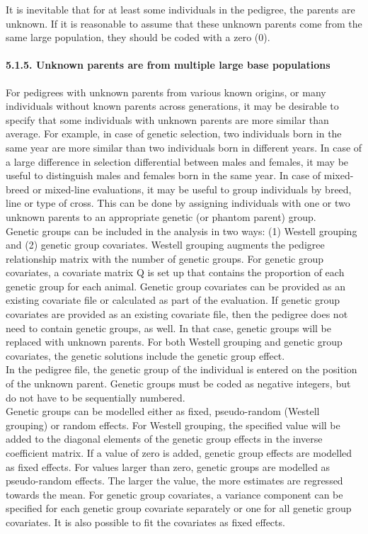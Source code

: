It is inevitable that for at least some individuals in the pedigree, the
parents are unknown. If it is reasonable to assume that these unknown
parents come from the same large population, they should be coded with a
zero (0).

\paragraph{5.1.5. Unknown parents are from multiple large base
populations}\label{Gene13}

For pedigrees with unknown parents from various known origins, or many
individuals without known parents across generations, it may be
desirable to specify that some individuals with unknown parents are more
similar than average. For example, in case of genetic selection, two
individuals born in the same year are more similar than two individuals
born in different years. In case of a large difference in selection
differential between males and females, it may be useful to distinguish
males and females born in the same year. In case of mixed-breed or
mixed-line evaluations, it may be useful to group individuals by breed,
line or type of cross. This can be done by assigning individuals with
one or two unknown parents to an appropriate genetic (or phantom parent)
group.\\
Genetic groups can be included in the analysis in two ways: (1) Westell
grouping and (2) genetic group covariates. Westell grouping augments the
pedigree relationship matrix with the number of genetic groups. For
genetic group covariates, a covariate matrix Q is set up that contains
the proportion of each genetic group for each animal. Genetic group
covariates can be provided as an existing covariate file or calculated
as part of the evaluation. If genetic group covariates are provided as
an existing covariate file, then the pedigree does not need to contain
genetic groups, as well. In that case, genetic groups will be replaced
with unknown parents. For both Westell grouping and genetic group
covariates, the genetic solutions include the genetic group effect.\\
In the pedigree file, the genetic group of the individual is entered on
the position of the unknown parent. Genetic groups must be coded as
negative integers, but do not have to be sequentially numbered.\\
Genetic groups can be modelled either as fixed, pseudo-random (Westell
grouping) or random effects. For Westell grouping, the specified value
will be added to the diagonal elements of the genetic group effects in
the inverse coefficient matrix. If a value of zero is added, genetic
group effects are modelled as fixed effects. For values larger than
zero, genetic groups are modelled as pseudo-random effects. The larger
the value, the more estimates are regressed towards the mean. For
genetic group covariates, a variance component can be specified for each
genetic group covariate separately or one for all genetic group
covariates. It is also possible to fit the covariates as fixed effects.

